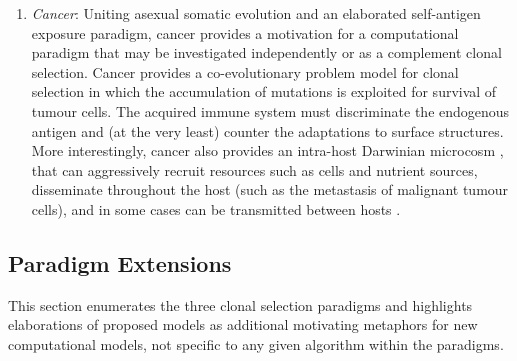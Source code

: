 \begin{enumerate}
	\item \emph{Cancer}: Uniting asexual somatic evolution and an elaborated self-antigen exposure paradigm, cancer provides a motivation for a computational paradigm that may be investigated independently or as a complement clonal selection. Cancer provides a co-evolutionary problem model for clonal selection in which the accumulation of mutations is exploited for survival of tumour cells. The acquired immune system must discriminate the endogenous antigen and (at the very least) counter the adaptations to surface structures. More interestingly, cancer also provides an intra-host Darwinian microcosm \cite{Vineis2003, Breivik2006, Vineis2006}, that can aggressively recruit resources such as cells and nutrient sources, disseminate throughout the host (such as the metastasis of malignant tumour cells), and in some cases can be transmitted between hosts \cite{Murgia2006}.
\end{enumerate}

%
%
\subsection{Paradigm Extensions}
This section enumerates the three clonal selection paradigms and highlights elaborations of proposed models as additional motivating metaphors for new computational models, not specific to any given algorithm within the paradigms.

